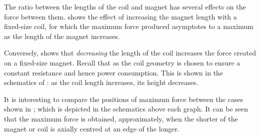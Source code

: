 The ratio between the lengths of the coil and magnet has several
effects on the force between them.  shows the
effect of increasing the magnet length with a fixed-size coil, for
which the maximum force produced asymptotes to a maximum as the
length of the magnet increases.

\begin{figure}
  \begin{subfigure}
  \end{subfigure}\par
  \begin{subfigure}
    \small{}
  \end{subfigure}
\end{figure}

Conversely,  shows that \emph{decreasing} the
length of the coil increases the force created on a fixed-size
magnet. Recall that as the coil geometry is chosen to ensure a constant
resistance and hence power consumption. This is shown in the schematics of 
: as the coil length increases, its height decreases.

It is interesting to compare the positions of maximum force
between the cases shown in ; 
which is depicted in the schematics above each graph.
It can be seen that the maximum force is obtained, approximately, when
the shorter of the magnet or coil is axially centred at an edge of the longer.

\begin{figure}
  \begin{subfigure}
  \end{subfigure}\par
  \begin{subfigure}
  \end{subfigure}
\end{figure}


